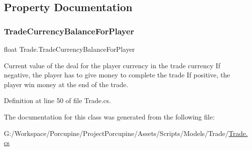\subsection{Property Documentation}
\mbox{\label{class_trade_aaba340cfdb727fe90d16a43fb3ebe3ae}} 
\subsubsection{\texorpdfstring{Trade\+Currency\+Balance\+For\+Player}{TradeCurrencyBalanceForPlayer}}
{\footnotesize\ttfamily float Trade.\+Trade\+Currency\+Balance\+For\+Player\hspace{0.3cm}{\ttfamily [get]}}



Current value of the deal for the player currency in the trade currency If negative, the player has to give money to complete the trade If positive, the player win money at the end of the trade. 



Definition at line 50 of file Trade.\+cs.



The documentation for this class was generated from the following file\+:\begin{DoxyCompactItemize}
\item 
G\+:/\+Workspace/\+Porcupine/\+Project\+Porcupine/\+Assets/\+Scripts/\+Models/\+Trade/\hyperlink{_trade_8cs}{Trade.\+cs}\end{DoxyCompactItemize}
